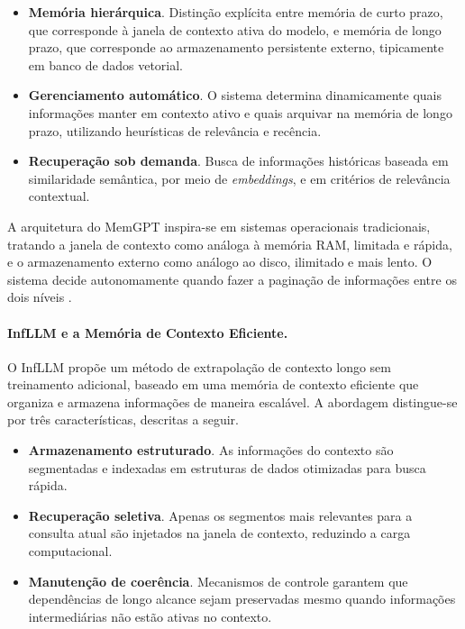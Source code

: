 \begin{itemize}[leftmargin=1.6em]
\item \textbf{Memória hierárquica}. Distinção explícita entre memória de curto prazo, que corresponde à janela de contexto ativa do modelo, e memória de longo prazo, que corresponde ao armazenamento persistente externo, tipicamente em banco de dados vetorial.

\item \textbf{Gerenciamento automático}. O sistema determina dinamicamente quais informações manter em contexto ativo e quais arquivar na memória de longo prazo, utilizando heurísticas de relevância e recência.

\item \textbf{Recuperação sob demanda}. Busca de informações históricas baseada em similaridade semântica, por meio de \textit{embeddings}, e em critérios de relevância contextual.
\end{itemize}

A arquitetura do MemGPT inspira-se em sistemas operacionais tradicionais, tratando a janela de contexto como análoga à memória RAM, limitada e rápida, e o armazenamento externo como análogo ao disco, ilimitado e mais lento. O sistema decide autonomamente quando fazer a paginação de informações entre os dois níveis \cite{packer2024memgpt}.

\paragraph{InfLLM e a Memória de Contexto Eficiente.}
O InfLLM \cite{xiao2024infllm} propõe um método de extrapolação de contexto longo sem treinamento adicional, baseado em uma memória de contexto eficiente que organiza e armazena informações de maneira escalável. A abordagem distingue-se por três características, descritas a seguir.

\begin{itemize}[leftmargin=1.6em]
\item \textbf{Armazenamento estruturado}. As informações do contexto são segmentadas e indexadas em estruturas de dados otimizadas para busca rápida.

\item \textbf{Recuperação seletiva}. Apenas os segmentos mais relevantes para a consulta atual são injetados na janela de contexto, reduzindo a carga computacional.

\item \textbf{Manutenção de coerência}. Mecanismos de controle garantem que dependências de longo alcance sejam preservadas mesmo quando informações intermediárias não estão ativas no contexto.
\end{itemize}

